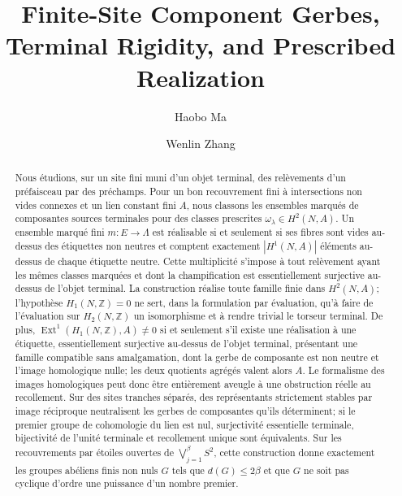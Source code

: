 \documentclass[12pt,reqno]{amsart}
\title[Finite-Site Component Gerbes]{Finite-Site Component Gerbes, Terminal Rigidity, and Prescribed Realization}
\author{Haobo Ma}
\author{Wenlin Zhang}
\theoremstyle{definition}
\theoremstyle{remark}
\begin{document}
\renewcommand{\abstractname}{Résumé}
\begin{abstract}
Nous étudions, sur un site fini muni d'un objet terminal, des relèvements
d'un préfaisceau par des préchamps. Pour un bon recouvrement fini à
intersections non vides connexes et un lien constant fini \(A\), nous
classons les ensembles marqués de composantes sources terminales pour des
classes prescrites \(\omega_\lambda\in H^2(N,A)\). Un ensemble marqué fini
\(m:E\to\Lambda\) est réalisable si et seulement si ses fibres sont vides
au-dessus des étiquettes non neutres et comptent exactement
\(|H^1(N,A)|\) éléments au-dessus de chaque étiquette neutre. Cette
multiplicité s'impose à tout relèvement ayant les mêmes classes marquées et
dont la champification est essentiellement surjective au-dessus de l'objet
terminal.
La construction réalise toute famille finie dans \(H^2(N,A)\); l'hypothèse
\(H_1(N,\mathbb Z)=0\) ne sert, dans la formulation par évaluation, qu'à
faire de l'évaluation sur \(H_2(N,\mathbb Z)\) un isomorphisme et à rendre
trivial le torseur terminal. De plus,
\(\operatorname{Ext}^1(H_1(N,\mathbb Z),A)\ne0\) si et seulement s'il existe
une réalisation à une étiquette, essentiellement surjective au-dessus de
l'objet terminal, présentant une famille compatible sans amalgamation, dont la
gerbe de composante est non neutre et l'image homologique nulle; les deux
quotients agrégés valent alors \(A\). Le formalisme des images
homologiques peut donc être
entièrement aveugle à une obstruction réelle au recollement. Sur des sites
tranches séparés, des représentants strictement stables par image réciproque
neutralisent les gerbes de composantes qu'ils déterminent; si le premier
groupe de cohomologie du lien est nul, surjectivité essentielle terminale,
bijectivité de l'unité terminale et recollement unique sont équivalents. Sur
les recouvrements par étoiles ouvertes de
\(\bigvee_{j=1}^{\beta}S^2\), cette construction
donne exactement les groupes abéliens finis non nuls \(G\) tels que
\(d(G)\leq 2\beta\) et que \(G\) ne soit pas cyclique d'ordre une puissance
d'un nombre premier.


\end{abstract}
\end{document}
